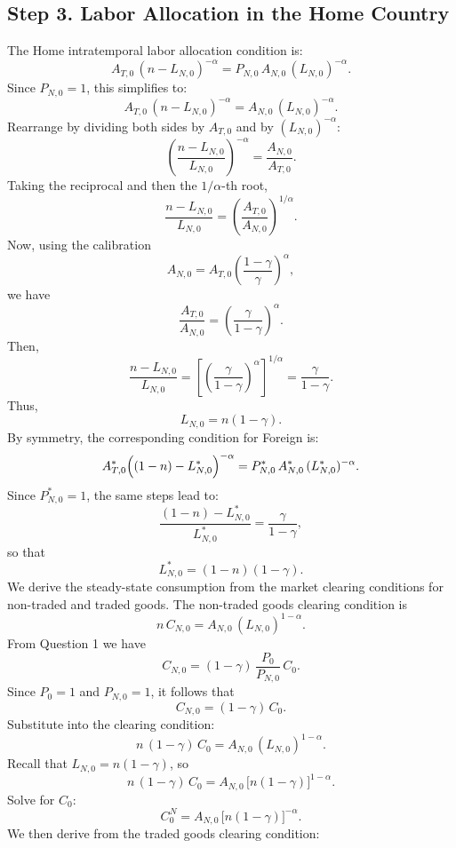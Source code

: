 \documentclass[a4paper,12pt]{article} %
\theoremstyle{nonitalic}
\begin{document}
\subsection*{Step 3. Labor Allocation in the Home Country}
The Home intratemporal labor allocation condition is:
\[
A_{T,0}\,(n-L_{N,0})^{-\alpha} = P_{N,0}\,A_{N,0}\,(L_{N,0})^{-\alpha}.
\]
Since $P_{N,0}=1$, this simplifies to:
\[
A_{T,0}\,(n-L_{N,0})^{-\alpha} = A_{N,0}\,(L_{N,0})^{-\alpha}.
\]
Rearrange by dividing both sides by $A_{T,0}$ and by $(L_{N,0})^{-\alpha}$:
\[
\left(\frac{n-L_{N,0}}{L_{N,0}}\right)^{-\alpha} = \frac{A_{N,0}}{A_{T,0}}.
\]
Taking the reciprocal and then the $1/\alpha$-th root,
\[
\frac{n-L_{N,0}}{L_{N,0}} = \left(\frac{A_{T,0}}{A_{N,0}}\right)^{1/\alpha}.
\]
Now, using the calibration 
\[
A_{N,0} = A_{T,0}\left(\frac{1-\gamma}{\gamma}\right)^{\alpha},
\]
we have
\[
\frac{A_{T,0}}{A_{N,0}} = \left(\frac{\gamma}{1-\gamma}\right)^{\alpha}.
\]
Then,
\[
\frac{n-L_{N,0}}{L_{N,0}} = \left[\left(\frac{\gamma}{1-\gamma}\right)^{\alpha}\right]^{1/\alpha} = \frac{\gamma}{1-\gamma}.
\]
Thus,
\[
\boxed{L_{N,0} = n(1-\gamma).}
\]
By symmetry, the corresponding condition for Foreign is:
\[
A^*_{T,0}\Bigl((1-n)-L^*_{N,0}\Bigr)^{-\alpha} = P^*_{N,0}\,A^*_{N,0}\,(L^*_{N,0})^{-\alpha}.
\]
Since $P^*_{N,0}=1$, the same steps lead to:
\[
\frac{(1-n)-L^*_{N,0}}{L^*_{N,0}} = \frac{\gamma}{1-\gamma},
\]
so that
\[
\boxed{L^*_{N,0} = (1-n)(1-\gamma).}
\]
We derive the steady-state consumption from the market clearing conditions for non-traded and traded goods.
The non-traded goods clearing condition is
\[
n\,C_{N,0} = A_{N,0}\,(L_{N,0})^{1-\alpha}.
\]
From Question 1 we have
\[
C_{N,0} = (1-\gamma)\,\frac{P_0}{P_{N,0}}\,C_0.
\]
Since $P_0=1$ and $P_{N,0}=1$, it follows that
\[
C_{N,0} = (1-\gamma)\,C_0.
\]
Substitute into the clearing condition:
\[
n\,(1-\gamma)\,C_0 = A_{N,0}\,(L_{N,0})^{1-\alpha}.
\]
Recall that $L_{N,0} = n(1-\gamma)$, so
\[
n\,(1-\gamma)\,C_0 = A_{N,0}\,\bigl[n(1-\gamma)\bigr]^{1-\alpha}.
\]
Solve for $C_0$:
\[
C_0^N = A_{N,0}\, \bigl[n(1-\gamma)\bigr]^{-\alpha}.
\]
We then derive from the traded goods clearing condition:
\end{document}
